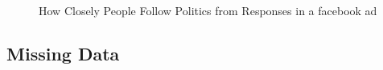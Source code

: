 \documentclass[
  letterpaper,
  DIV=11,
  numbers=noendperiod]{scrartcl}
\begin{document}
\begin{figure}


\caption{\label{fig-figure2}How Closely People Follow Politics from
Responses in a facebook ad}

\end{figure}%

\subsection{Missing Data}\label{sec-Missing_data}
\end{document}
